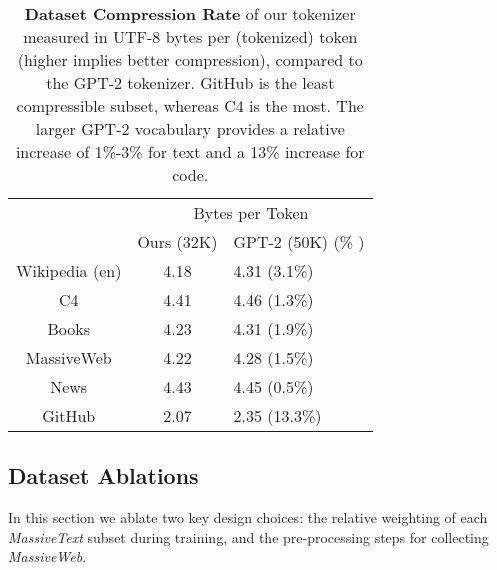 \documentclass[11pt, a4paper, logo, internal, copyright, nonumbering]{deepmind}
\newcommand{\massivetext}{\textit{MassiveText}\xspace}
\newcommand{\massiveweb}{\textit{MassiveWeb}\xspace}
\begin{document}
\begin{table}[H]
    \centering
    \begin{tabular}{ccl}
    \toprule
 	    & \multicolumn{2}{c}{Bytes per Token}  \\
                & Ours (32K) & GPT-2 (50K) (\% ) \\
    \midrule
    Wikipedia (en) & 4.18 & 4.31 (3.1\%) \\
    C4 & 4.41 & 4.46 (1.3\%) \\
    Books & 4.23 & 4.31 (1.9\%) \\
    MassiveWeb & 4.22 & 4.28 (1.5\%) \\
    News & 4.43 & 4.45 (0.5\%) \\
    GitHub & 2.07 & 2.35 (13.3\%) \\
    \bottomrule
    \end{tabular}
    \caption{\textbf{Dataset Compression Rate} of our tokenizer measured in UTF-8 bytes per (tokenized) token (higher implies better compression), compared to the GPT-2 tokenizer. GitHub is the least compressible subset, whereas C4 is the most. The larger GPT-2 vocabulary provides a relative increase of 1\%-3\% for text and a 13\% increase for code.}
    \label{tab:token_compress}
\end{table}

\subsection{Dataset Ablations}
\label{sec:dataset-ablations}
In this section we ablate two key design choices: the relative weighting of each \massivetext subset during training, and the pre-processing steps for collecting \massiveweb.
\end{document}
